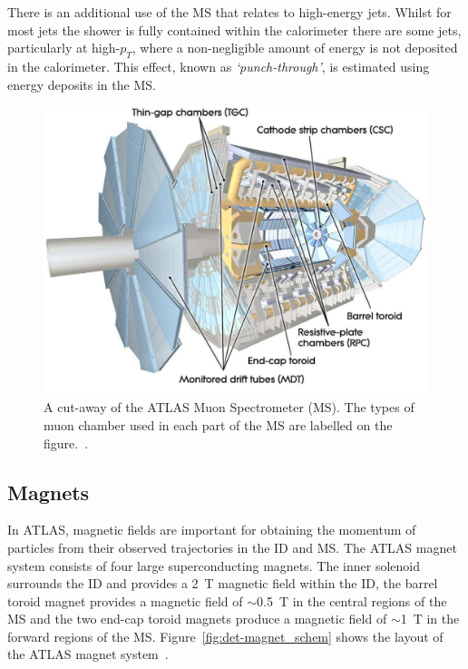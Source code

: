 There is an additional use of the MS that relates to high-energy jets.
Whilst for most jets the shower is fully contained within the calorimeter
there are some jets, particularly at high-$p_T$, where a non-negligible amount of energy is not deposited in the calorimeter.
This effect, known as \textit{`punch-through'}, is estimated using energy deposits in the MS.

\vspace{1em}
\begin{figure}[!htb]
  \begin{center}
    \includegraphics[width=1\linewidth, angle=0]{figs/Detector/MS_schem.pdf}
  \end{center}
  \caption[A cut-away of the ATLAS Muon Spectrometer.]
          {A cut-away of the ATLAS Muon Spectrometer (MS). The types of muon chamber used in each part of the MS are labelled on the figure.~\cite{det-ATLAS_Exp}.}
  \label{fig:det-ms_schem}
\end{figure}

\newpage
\subsection{Magnets}
\label{sec:det-magnets}

In ATLAS, magnetic fields are important for obtaining the momentum of particles from their observed trajectories in the ID and MS.
The ATLAS magnet system consists of four large superconducting magnets.
The inner solenoid surrounds the ID and provides a 2~T magnetic field within the ID,
the barrel toroid magnet provides a magnetic field of $\sim$0.5~T in the central regions of the MS and
the two end-cap toroid magnets produce a magnetic field of $\sim$1~T in the forward regions of the MS.
Figure~\ref{fig:det-magnet_schem} shows the layout of the ATLAS magnet system~\cite{det-magnet_fig}.

